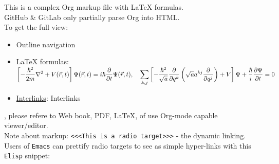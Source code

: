 \documentclass[a4paper,14pt,oneside]{book}
\begin{document}
This is a complex Org markup file with \LaTeX{} formulas.\\
GitHub \& GitLab only partially parse Org into HTML.\\

To get the full view:\\
\begin{itemize}
\item Outline navigation\\
\item \LaTeX{} formulas:\\
\({\displaystyle\left[{-\frac{\hbar^{2}}{2m}}\nabla^{2}+V(\vec{r},t)\right]\Psi({\vec{r}},t)=i\hbar{\partial\over\partial{t}}\Psi({\vec{r}},t),\quad\sum_{k,j}\left[-{\frac{\hbar^{2}}{\sqrt{a}}}{\frac{\partial}{\partial{q^{k}}}}\left({\sqrt{a}}a^{kj}{\frac{\partial}{\partial{q^{j}}}}\right)+V\right]\Psi+{\frac{\hbar}{i}}{\frac{\partial{\Psi}}{\partial{t}}}=0}\)\\
\item \hyperref[org8500c3e]{Interlinks}: \label{org8500c3e}Interlinks\\
\end{itemize}

, please refere to Web book, PDF, \LaTeX{}, of use Org-mode capable viewer/editor.\\

Note about markup: \texttt{<<<This is a radio target>>>} - the dynamic linking.\\

Users of \texttt{Emacs} can prettify radio targets to see as simple hyper-links with this \texttt{Elisp} snippet:\\
\end{document}
